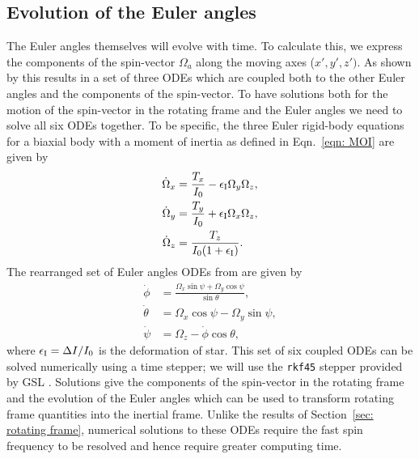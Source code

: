 \documentclass[../full_thesis/full_thesis.tex]{subfiles}
\begin{document}
\subsection{Evolution of the Euler angles}
\label{sec: evolution of the euler angles}
The Euler angles themselves will evolve with time. To calculate this, we
express the components of the spin-vector $\Omega_a$ along the moving axes ($x', y', z')$. As
shown by \citet{Landau1969} this results in a set of three ODEs which are
coupled both to the other Euler angles and the components of the spin-vector.
To have solutions both for the motion of the spin-vector in the rotating frame
and the Euler angles we need to solve all six ODEs together. To be specific,
the three Euler rigid-body equations for a biaxial body with a moment
of inertia as defined in Eqn.~\eqref{eqn: MOI} are given by
\begin{align}
\dot{\Omega}_{x} & = \frac{T_x}{I_{0}} -\epsilon_{\mathrm{I}} \Omega_{y} \Omega_{z},
\label{eqn: 6ODE x}
\\
\dot{\Omega}_{y} & = \frac{T_y}{I_{0}} + \epsilon_{\mathrm{I}} \Omega_{x} \Omega_{z},
\label{eqn: 6ODE y}
\\
\dot{\Omega}_{z} & =\frac{T_z}{I_{0}(1+\epsilon_{\mathrm{I}})}.
\label{eqn: 6ODE z}
\end{align}
The rearranged set of Euler angles ODEs from \citet{Landau1969} are given
by
\begin{align}
\dot{\phi} & = \frac{\Omega_{x} \sin \psi + \Omega_{y} \cos \psi}{\sin \theta},
\label{eqn: 6ODE phi}
\\
\dot{\theta} & = \Omega_{x} \cos \psi - \Omega_{y} \sin \psi,
\label{eqn: 6ODE theta}
\\
\dot{\psi} & = \Omega_{z} - \dot{\phi} \cos \theta,
\label{eqn: 6ODE psi}
\end{align}
where $\epsilon_{\mathrm{I}} = \Delta I/I_0$ is the deformation of star.
This set of six coupled ODEs can be solved numerically using a time stepper; we
will use the \texttt{rkf45} stepper provided by GSL \citep{gough2009gnu}.
Solutions give the components of the spin-vector in the rotating frame and the
evolution of the Euler angles which can be used to transform rotating frame
quantities into the inertial frame. Unlike the results of Section~\ref{sec:
rotating frame}, numerical solutions to these ODEs require the fast spin frequency
to be resolved and hence require greater computing time.

\end{document}
